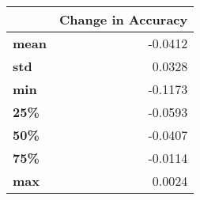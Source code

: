 \begin{tabular}{lr}
\toprule
{} &  Change in Accuracy \\
\midrule
\textbf{mean} &             -0.0412 \\
\textbf{std } &              0.0328 \\
\textbf{min } &             -0.1173 \\
\textbf{25\% } &             -0.0593 \\
\textbf{50\% } &             -0.0407 \\
\textbf{75\% } &             -0.0114 \\
\textbf{max } &              0.0024 \\
\bottomrule
\end{tabular}
